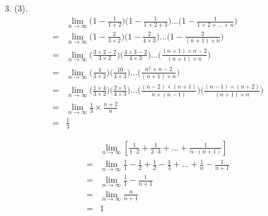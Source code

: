 \begin{solve}3. (3).
	\begin{align*}
		&\lim_{n\rightarrow\infty}\Big(1-\frac{1}{1+2}\Big)\Big(1-\frac{1}{1+2+3}\Big)\dots\Big(1-\frac{1}{1+2+\dots+n}\Big)\\
		=&\lim_{n\rightarrow\infty}\Big(1-\frac{2}{3\times2}\Big)\Big(1-\frac{2}{4\times3}\Big)\dots\Big(1-\frac{2}{(n+1)\times{n}}\Big)\\
		=&\lim_{n\rightarrow\infty}\Big(\frac{3\times2-2}{3\times2}\Big)\Big(\frac{4\times3-2}{4\times3}\Big)\dots\Big(\frac{(n+1)\times{n}-2}{(n+1)\times{n}}\Big)\\
		=&\lim_{n\rightarrow\infty}\Big(\frac{4}{3\times2}\Big)\Big(\frac{10}{4\times3}\Big)\dots\Big(\frac{n^2+n-2}{(n+1)\times{n}}\Big)\\
		=&\lim_{n\rightarrow\infty}\Big(\frac{1\times4}{3\times2}\Big)\Big(\frac{2\times5}{4\times3}\Big)\dots\Big(\frac{(n-2)\times(n+1)}{n\times(n-1)}\Big)\Big(\frac{(n-1)\times(n+2)}{(n+1)\times{n}}\Big)\\
		=&\lim_{n\rightarrow\infty}\frac{1}{3}\times\frac{n+2}{n}\\
		=&\frac{1}{3}
	\end{align*}	
\end{solve}

\begin{align*}
	&\lim_{n\rightarrow\infty}[\frac{1}{1\cdot2}+\frac{1}{2\cdot3}+\dots+\frac{1}{n\cdot(n+1)}]\\
	=&\lim_{n\rightarrow\infty} \frac{1}{1}-\frac{1}{2}+\frac{1}{2}-\frac{1}{3}+\dots+\frac{1}{n}-\frac{1}{n+1}\\
	=&\lim_{n\rightarrow\infty}\frac{1}{1}-\frac{1}{n+1}\\
	=&\lim_{n\rightarrow\infty}\frac{n}{n+1}\\
	=&1
\end{align*}

